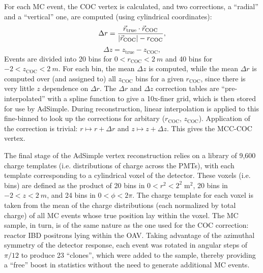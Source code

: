 \documentclass[../thesis.tex]{subfiles}
\begin{document}
For each MC event, the COC vertex is calculated, and two corrections, a
``radial'' and a ``vertical'' one, are computed (using cylindrical coordinates):
\begin{equation*}
  \Delta r = \frac{\vec{r}_{\mathrm{true}} \cdot \vec{r}_{\mathrm{COC}}}{\lvert \vec{r}_{\mathrm{COC}}\rvert - r_{\mathrm{COC}}},
\end{equation*}
\begin{equation*}
  \Delta z = z_{\mathrm{true}} - z_{\mathrm{COC}},
\end{equation*}
Events are divided into 20 bins for $0 < r_{\mathrm{COC}} < \SI{2}{m}$ and 40
bins for $-2 < z_{\mathrm{COC}} < \SI{2}{m}$. For each bin, the mean $\Delta z$
is computed, while the mean $\Delta r$ is computed over (and assigned to) all
$z{_\mathrm{COC}}$ bins for a given $r_{\mathrm{COC}}$, since there is very
little $z$ dependence on $\Delta r$. The $\Delta r$ and $\Delta z$ correction
tables are ``pre-interpolated'' with a spline function to give a 10x-finer grid,
which is then stored for use by AdSimple. During reconstruction, linear
interpolation is applied to this fine-binned to look up the corrections for
arbitary ($r_{\mathrm{COC}}$, $z_{\mathrm{COC}}$). Application of the correction
is trivial: $r \mapsto r + \Delta r$ and $z \mapsto z + \Delta z$. This gives
the MCC-COC vertex.

The final stage of the AdSimple vertex reconstruction relies on a library of
9,600 charge templates (i.e. distributions of charge across the PMTs), with each
template corresponding to a cylindrical voxel of the detector. These voxels
(i.e. bins) are defined as the product of 20 bins in $0 < r^2 <
2^2\;\mathrm{m}^2$, 20 bins in $-2 < z < \SI{2}{m}$, and 24 bins in $0 < \phi <
2\pi$. The charge template for each voxel is taken from the mean of the charge
distributions (each normalized by total charge) of all MC events whose true
position lay within the voxel. The MC sample, in turn, is of the same nature as
the one used for the COC correction: reactor IBD positrons lying within the
OAV. Taking advantage of the azimuthal symmetry of the detector response, each
event was rotated in angular steps of $\pi/12$ to produce 23 ``clones'', which
were added to the sample, thereby providing a ``free'' boost in statistics
without the need to generate additional MC events.

\newcommand\Niobs{N_i^{\mathrm{obs}}} \newcommand\Niexp{N_i^{\mathrm{exp}}}
\end{document}
